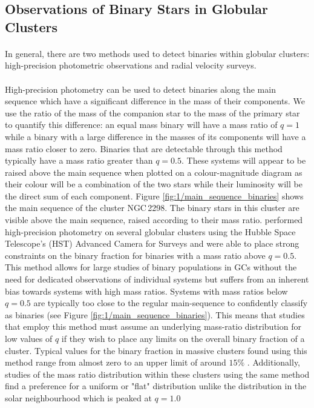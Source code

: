 \subsection{Observations of Binary Stars in Globular Clusters}

\paragraph{}
In general, there are two methods used to detect binaries within globular clusters: high-precision
photometric observations and radial velocity surveys.

\paragraph{}
High-precision photometry can be used to detect binaries along the main sequence which have a
significant difference in the mass of their components. We use the ratio of the mass of the
companion star to the mass of the primary star to quantify this difference: an equal mass binary
will have a mass ratio of $q=1$ while a binary with a large difference in the masses of its
components will have a mass ratio closer to zero. Binaries that are detectable through this method
typically have a mass ratio greater than $q=0.5$. These systems will appear to be raised above the
main sequence when plotted on a colour-magnitude diagram as their colour will be a combination of
the two stars while their luminosity will be the direct sum of each component. Figure
\ref{fig:1/main_sequence_binaries} shows the main sequence of the cluster NGC\,2298. The binary
stars in this cluster are visible above the main sequence, raised according to their mass ratio.
\citet{Milone2012} performed high-precision photometry on several globular clusters using the Hubble
Space Telescope's (HST) Advanced Camera for Surveys and were able to place strong constraints on the
binary fraction for binaries with a mass ratio above $q=0.5$. This method allows for large studies
of binary populations in GCs without the need for dedicated observations of individual systems but
suffers from an inherent bias towards systems with high mass ratios. Systems with mass ratios below
$q=0.5$ are typically too close to the regular main-sequence to confidently classify as binaries
(see Figure \ref{fig:1/main_sequence_binaries}). This means that studies that employ this method
must assume an underlying mass-ratio distribution for low values of $q$ if they wish to place any
limits on the overall binary fraction of a cluster. Typical values for the binary fraction in
massive clusters found using this method range from almost zero to an upper limit of around $15\%$
\citep{Milone2012}. Additionally, studies of the mass ratio distribution within these clusters using
the same method find a preference for a uniform or "flat" distribution unlike the distribution in
the solar neighbourhood which is peaked at $q=1.0$ \citep{Milone2012,Fisher2005,Reggiani2013}


